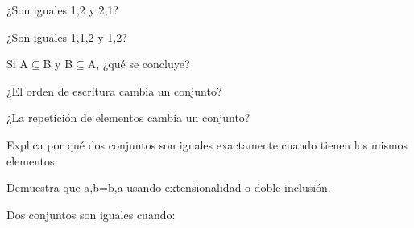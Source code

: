 \begin{activity}[id=dia-21-corta-02,type=short,weight=1]

¿Son iguales {1,2} y {2,1}?

\end{activity}

\begin{activity}[id=dia-21-corta-03,type=short,weight=1]

¿Son iguales {1,1,2} y {1,2}?

\end{activity}

\begin{activity}[id=dia-21-corta-04,type=short,weight=1]

Si A\(\subseteq\)B y B\(\subseteq\)A, ¿qué se concluye?

\end{activity}

\begin{activity}[id=dia-21-corta-05,type=short,weight=1]

¿El orden de escritura cambia un conjunto?

\end{activity}

\begin{activity}[id=dia-21-corta-06,type=short,weight=1]

¿La repetición de elementos cambia un conjunto?

\end{activity}

\begin{activity}[id=dia-21-desarrollo-01,type=long,weight=2]

Explica por qué dos conjuntos son iguales exactamente cuando tienen los mismos elementos.

\end{activity}

\begin{activity}[id=dia-21-desarrollo-02,type=long,weight=2]

Demuestra que {a,b}={b,a} usando extensionalidad o doble inclusión.

\end{activity}

\begin{activity}[id=dia-21-opcion-01,type=choice,weight=1]

Dos conjuntos son iguales cuando:





\end{activity}

